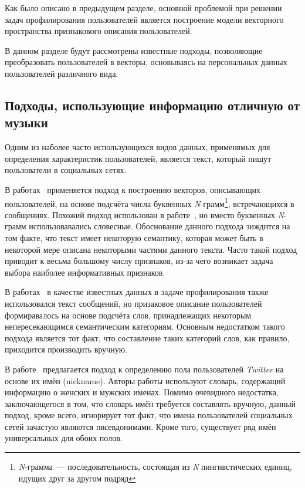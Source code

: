 Как было описано в предыдущем разделе, основной проблемой при решении
задач профилирования пользователей является построение модели
векторного пространства признакового описания пользователей.

В данном разделе будут рассмотрены известные подходы,
позволяющие преобразовать пользователей в векторы, основываясь
на персональных данных пользователей различного вида.

\subsection{Подходы, использующие информацию отличную от музыки}
\label{ssec:without_music}

Одним из наболее часто использующихся видов данных, применямых
для определения характеристик пользователей, является текст, который
пишут пользователи в социальных сетях. 

В работах~\cite{miller2012gender,deitrick2012gender} применяется
подход к построению векторов, описывающих пользователей, на основе подсчёта
числа буквенных \textit{N}-грамм\footnote{\textit{N}-грамма~--- 
последовательность, состоящая из \textit{N} лингивстических единиц,
идущих друг за другом подряд}, встречающихся в сообщениях. Похожий
подход использован в работе~\cite{turdakov2013opredelenie}, но
вместо буквенных \textit{N}-грамм использовавались словесные. Обоснование
данного подхода зиждится на том факте, что текст имеет некоторую
семантику, которая может быть в некоторой мере описана некоторыми
частями данного текста. Часто такой подход приводит к весьма большому
числу признаков, из-за чего возникает задача выбора наиболее
информативных признаков.

В работах~\cite{rosenthal2011age,schwartz2013personality} в качестве
известных данных в задаче профилирования также
использовался текст сообщений, но призаковое описание пользователей
формиравалось на основе подсчёта слов, принадлежащих некоторым
непересекающимся семантическим категориям. Основным недостатком такого подхода
является тот факт, что составление таких категорий слов, как правило,
приходится производить вручную.

В работе~\cite{sloan2013knowing} предлагается подход к определению
пола пользователей \textit{Twitter} на основе их имён (nickname).
Авторы работы используют словарь, содержащий информацию о женских и мужских
именах. Помимо очевидного недостатка, заключающегося в том, что
словарь имён требуется составлять вручную, данный подход, кроме всего,
игнорирует тот факт, что имена пользователей социальных сетей зачастую
являются пвсевдонимами. Кроме того, существует ряд имён универсальных
для обоих полов.

